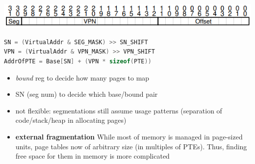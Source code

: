 \includegraphics[width=\linewidth]{imgs/virtual_addr2_32big_hybrid}
\begin{minipage}{0.61\linewidth}
\begin{lstlisting}[language=c,xrightmargin=2pt]
SN = (VirtualAddr & SEG_MASK) >> SN_SHIFT
VPN = (VirtualAddr & VPN_MASK) >> VPN_SHIFT
AddrOfPTE = Base[SN] + (VPN * sizeof(PTE))
\end{lstlisting}
\end{minipage}
\begin{minipage}{0.39\linewidth}
  \flushleft
  \begin{itemize}
  \item \emph{bound} reg to decide how many pages to map
  \item SN (seg num) to decide which base/bound pair
  \end{itemize}
\end{minipage}
\begin{itemize}
\item not flexible: segmentations still assume usage patterns (separation of code/stack/heap in allocating pages)
\item \textbf{external fragmentation} While most of memory is managed in page-sized units, page tables now of arbitrary size (in multiples of PTEs). Thus, finding free space for them in memory is more complicated
\end{itemize}
